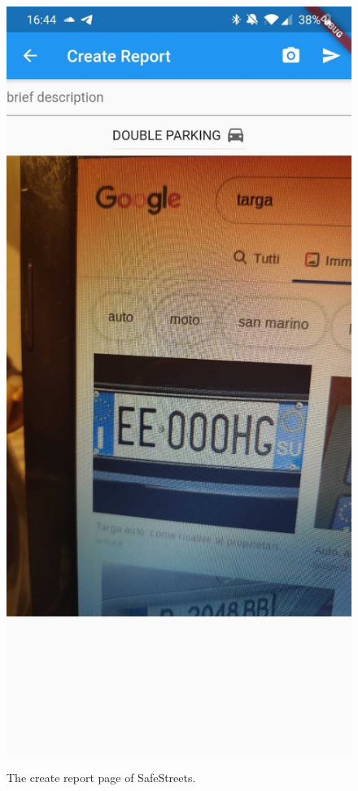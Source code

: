 \documentclass[../RASD.tex]{subfiles}
\begin{document}
    \begin{figure}[H]
        \centering
        \includegraphics[scale = 0.2]{assets/app_screenshots/create.jpg}\\[1.6 cm]
        \caption[\textit{Create Report} Screenshot]{The create report page of SafeStreets.}
    \end{figure}
\end{document}
